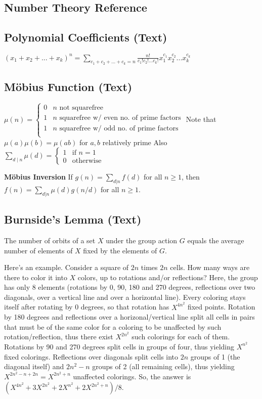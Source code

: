 \documentclass[9pt]{extarticle}
\begin{document}
\begin{multicols*}{3}
\section{Number Theory Reference}
\subsection{Polynomial Coefficients (Text)} %
$(x_1 + x_2 + ... + x_k)^n = \sum_{c_1 + c_2 + ... + c_k = n}
\frac{n!}{c_1! c_2! ... c_k!} x_1^{c_1} x_2^{c_2} ... x_k^{c_k}$

\subsection{M\"obius Function (Text)} %
$\mu(n) = \begin{cases}
0 & \text{$n$ not squarefree} \\
1 & \text{$n$ squarefree w/ even no. of prime factors} \\
1 & \text{$n$ squarefree w/ odd no. of prime factors} \\
\end{cases}$
Note that $\mu(a) \mu(b) = \mu(ab)$ for $a, b$ relatively prime
Also $\sum_{d \mid n} \mu(d) = \begin{cases} 1 & \text{if $n = 1$} \\
0 & \text{otherwise} \end{cases}$

\textbf{M\"obius Inversion}
If $g(n) = \sum_{d|n} f(d)$ for all $n \ge 1$, then
$f(n) = \sum_{d|n} \mu(d)g(n/d)$ for all $n \ge 1$.

\subsection{Burnside's Lemma (Text)} %
The number of orbits of a set $X$ under the group action $G$ equals the average
number of elements of $X$ fixed by the elements of $G$.

Here's an example. Consider a square of $2n$ times $2n$ cells. How many ways
are there to color it into $X$ colors, up to rotations and/or reflections?
Here, the group has only 8 elements (rotations by 0, 90, 180 and 270 degrees,
reflections over two diagonals, over a vertical line and over a horizontal
line). Every coloring stays itself after rotating by 0 degrees, so that
rotation has $X^{4n^2}$ fixed points. Rotation by 180 degrees and reflections
over a horizonal/vertical line split all cells in pairs that must be of the
same color for a coloring to be unaffected by such rotation/reflection, thus
there exist $X^{2n^2}$ such colorings for each of them. Rotations by 90 and 270
degrees split cells in groups of four, thus yielding $X^{n^2}$ fixed colorings.
Reflections over diagonals split cells into $2n$ groups of 1 (the diagonal
itself) and $2n^2-n$ groups of 2 (all remaining cells), thus yielding
$X^{2n^2-n+2n}=X^{2n^2+n}$ unaffected colorings.  So, the answer is
$(X^{4n^2}+3X^{2n^2}+2X^{n^2}+2X^{2n^2+n})/8$.


\end{multicols*}
\end{document}

